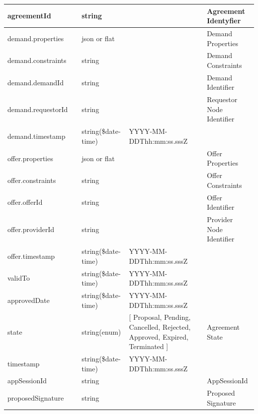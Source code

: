 \begin{enumerate}
\begin{center}
\begin{tabular}{|p{3cm}|l|p{3cm}|p{3cm}|p{4cm}|}
agreementId				& 	& 	string				&		&	Agreement Identyfier \\ 
\hline

demand.properties		&	&	json or flat		&		& 	Demand Properties \\
\hline

demand.constraints		&	&	string				&		&	Demand Constraints \\	
\hline

demand.demandId			&	&	string				&		&	Demand Identifier \\
\hline 		

demand.requestorId		&	&	string 				&		&	Requestor Node Identifier \\
\hline

demand.timestamp		& 	& 	string(\$date-time)	&	YYYY-MM-DDThh:mm:ss.sssZ	&	 \\ 
\hline

offer.properties		&	&	json or flat		&		& 	Offer Properties \\
\hline

offer.constraints		&	&	string				&		&	Offer Constraints \\	
\hline

offer.offerId			&	&	string				&		&	Offer Identifier \\
\hline 		

offer.providerId		&	&	string 				&		&	Provider Node Identifier \\
\hline

offer.timestamp		& 	& 	string(\$date-time)	&	YYYY-MM-DDThh:mm:ss.sssZ	&	 \\ 
\hline

validTo			& 	& 	string(\$date-time)	&	YYYY-MM-DDThh:mm:ss.sssZ	&	 \\ 
\hline

approvedDate	& 	& 	string(\$date-time)	&	YYYY-MM-DDThh:mm:ss.sssZ	&	 \\ 
\hline

state			& 	& 	string(enum)		&	[ Proposal, Pending, Cancelled, Rejected, Approved, Expired, Terminated ]	& Agreement State	\\ 
\hline

timestamp		& 	& 	string(\$date-time)	&	YYYY-MM-DDThh:mm:ss.sssZ	&	 \\ 
\hline

appSessionId	&	&	string 				&			&	AppSessionId \\
\hline

proposedSignature &		& string 			&			&	Proposed Signature \\
\hline


\end{tabular}
\end{center}
\end{enumerate}
